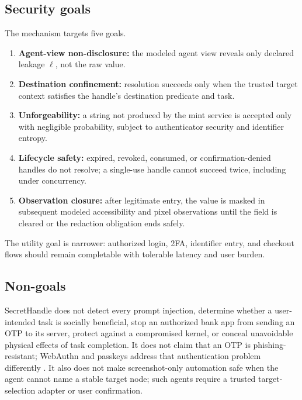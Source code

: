 \subsection{Security goals}



The mechanism targets five goals.

\begin{enumerate}[leftmargin=*]
  \item \textbf{Agent-view non-disclosure:} the modeled agent view reveals only declared leakage $\ell$, not the raw value.
  \item \textbf{Destination confinement:} resolution succeeds only when the trusted target context satisfies the handle's destination predicate and task.
  \item \textbf{Unforgeability:} a string not produced by the mint service is accepted only with negligible probability, subject to authenticator security and identifier entropy.
  \item \textbf{Lifecycle safety:} expired, revoked, consumed, or confirmation-denied handles do not resolve; a single-use handle cannot succeed twice, including under concurrency.
  \item \textbf{Observation closure:} after legitimate entry, the value is masked in subsequent modeled accessibility and pixel observations until the field is cleared or the redaction obligation ends safely.
\end{enumerate}

The utility goal is narrower: authorized login, 2FA, identifier entry, and checkout flows should remain completable with tolerable latency and user burden.

\subsection{Non-goals}

SecretHandle does not detect every prompt injection, determine whether a user-intended task is socially beneficial, stop an authorized bank app from sending an OTP to its server, protect against a compromised kernel, or conceal unavoidable physical effects of task completion. It does not claim that an OTP is phishing-resistant; WebAuthn and passkeys address that authentication problem differently \cite{webauthn3}. It also does not make screenshot-only automation safe when the agent cannot name a stable target node; such agents require a trusted target-selection adapter or user confirmation.
